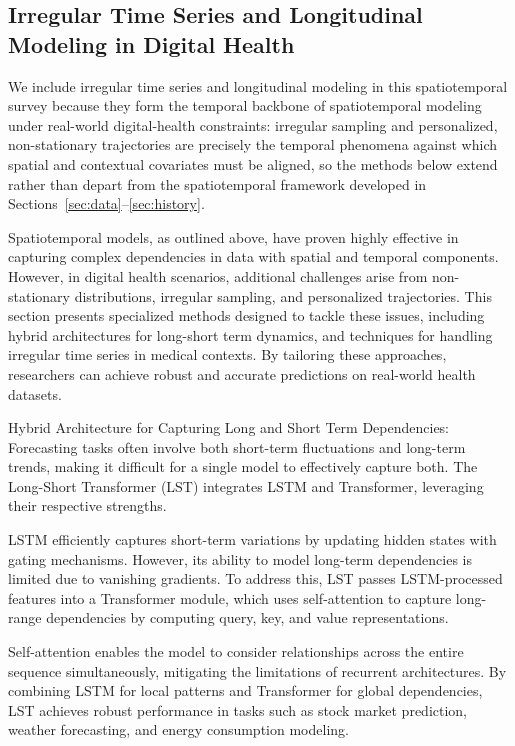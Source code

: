 \documentclass[acmsmall]{acmart}
\begin{document}
 
\subsection {Irregular Time Series and Longitudinal Modeling in Digital Health}
We include irregular time series and longitudinal modeling in this spatiotemporal survey because they form the temporal backbone of spatiotemporal modeling under real-world digital-health constraints: irregular sampling and personalized, non-stationary trajectories are precisely the temporal phenomena against which spatial and contextual covariates must be aligned, so the methods below extend rather than depart from the spatiotemporal framework developed in Sections~\ref{sec:data}--\ref{sec:history}.

Spatiotemporal models, as outlined above, have proven highly effective in capturing complex dependencies in data with spatial and temporal components. However, in digital health scenarios, additional challenges arise from non-stationary distributions, irregular sampling, and personalized trajectories. This section presents specialized methods designed to tackle these issues, including hybrid architectures for long-short term dynamics, and techniques for handling irregular time series in medical contexts. By tailoring these approaches, researchers can achieve robust and accurate predictions on real-world health datasets.

Hybrid Architecture for Capturing Long and Short Term Dependencies: Forecasting tasks often involve both short-term fluctuations and long-term trends, making it difficult for a single model to effectively capture both. The Long-Short Transformer (LST) integrates LSTM and Transformer, leveraging their respective strengths.

LSTM efficiently captures short-term variations by updating hidden states with gating mechanisms. However, its ability to model long-term dependencies is limited due to vanishing gradients. To address this, LST passes LSTM-processed features into a Transformer module, which uses self-attention to capture long-range dependencies by computing query, key, and value representations.

Self-attention enables the model to consider relationships across the entire sequence simultaneously, mitigating the limitations of recurrent architectures. By combining LSTM for local patterns and Transformer for global dependencies, LST achieves robust performance in tasks such as stock market prediction, weather forecasting, and energy consumption modeling.
\end{document}
